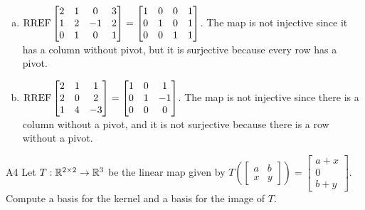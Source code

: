 \documentclass{sbgLAsemi}
\begin{document}
\begin{solution}
\begin{enumerate}[(a)]
\item
  \(\operatorname{RREF}\begin{bmatrix}
    2 & 1 & 0 & 3 \\
    1 & 2 & -1 & 2\\
    0 & 1 & 0 & 1
  \end{bmatrix}=\begin{bmatrix}
    1 & 0 & 0 & 1\\
    0 & 1 & 0 & 1\\
    0 & 0 & 1 & 1
  \end{bmatrix}\).
  The map is not injective since it has a column without pivot,
  but it is surjective because every row has a pivot.
\item
  \(\operatorname{RREF}\begin{bmatrix}
    2 & 1 & 1 \\
    2 & 0 & 2 \\
    1 & 4 & -3
  \end{bmatrix}=\begin{bmatrix}
    1 & 0 & 1 \\
    0 & 1 & -1 \\
    0 & 0 & 0
  \end{bmatrix}\).
  The map is not injective since there is a column without a pivot,
  and it is not surjective because there is a row without a pivot.
\end{enumerate}
\end{solution}
\begin{problem}{A4}
Let $T: \mathbb{R}^{2\times 2} \rightarrow \mathbb{R}^3$ be the linear map given by \(
  T\left(\begin{bmatrix} a & b \\ x & y \end{bmatrix} \right) =
  \begin{bmatrix}
    a+x \\ 0 \\ b+y
  \end{bmatrix}
\). Compute a basis for the kernel and a basis for the image of $T$.
\end{problem}
\end{document}
